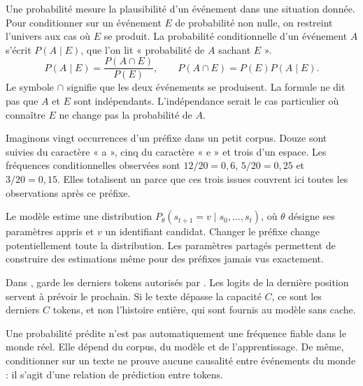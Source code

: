 

Une probabilité mesure la plausibilité d'un événement dans une
situation donnée. Pour conditionner sur un événement \(E\) de
probabilité non nulle, on restreint l'univers aux cas où \(E\)
se produit. La probabilité conditionnelle d'un événement \(A\)
s'écrit \(P(A\mid E)\), que l'on lit « probabilité de \(A\)
sachant \(E\) ».
\[
 P(A\mid E)=\frac{P(A\cap E)}{P(E)},
 \qquad P(A\cap E)=P(E)P(A\mid E).
\]
Le symbole \(\cap\) signifie que les deux événements se produisent.
La formule ne dit pas que \(A\) et \(E\) sont indépendants.
L'indépendance serait le cas particulier où connaître \(E\)
ne change pas la probabilité de \(A\).

Imaginons vingt occurrences d'un préfixe dans un petit corpus.
Douze sont suivies du caractère « a », cinq du caractère « e »
et trois d'un espace. Les fréquences conditionnelles observées
sont \(12/20=0{,}6\), \(5/20=0{,}25\) et
\(3/20=0{,}15\). Elles totalisent un parce que ces trois
issues couvrent ici toutes les observations après ce préfixe.

Le modèle estime une distribution
\(P_\theta(s_{t+1}=v\mid s_0,\ldots,s_t)\), où \(\theta\)
désigne ses paramètres appris et \(v\) un identifiant candidat.
Changer le préfixe change potentiellement toute la distribution.
Les paramètres partagés permettent de construire des estimations
même pour des préfixes jamais vus exactement.

Dans ,  garde les derniers tokens
autorisés par . Les logits de la dernière
position servent à prévoir le prochain. Si le texte dépasse
la capacité \(C\), ce sont les derniers \(C\) tokens, et non
l'histoire entière, qui sont fournis au modèle sans cache.

Une probabilité prédite n'est pas automatiquement une fréquence
fiable dans le monde réel. Elle dépend du corpus, du modèle
et de l'apprentissage. De même, conditionner sur un texte ne
prouve aucune causalité entre événements du monde : il s'agit
d'une relation de prédiction entre tokens.

